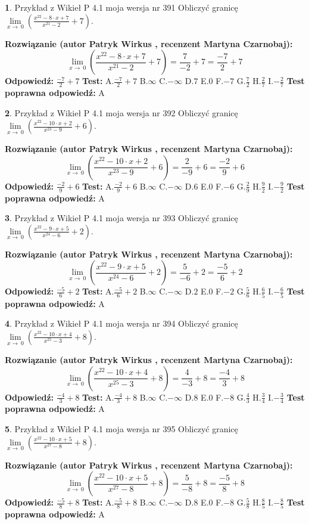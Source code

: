 \documentclass[12pt, a4paper]{article}
\theoremstyle{definition} %
\newtheorem{zad}{}
\newcommand{\zadStart}[1]{\begin{zad}#1\newline}
\newcommand{\zadStop}{\end{zad}}
\newcommand{\rozwStart}[2]{\noindent \textbf{Rozwiązanie (autor #1 , recenzent #2): }\newline}
\newcommand{\rozwStop}{\newline}
\newcommand{\odpStart}{\noindent \textbf{Odpowiedź:}\newline}
\newcommand{\odpStop}{\newline}
\newcommand{\testStart}{\noindent \textbf{Test:}\newline}
\newcommand{\testStop}{\newline}
\newcommand{\kluczStart}{\noindent \textbf{Test poprawna odpowiedź:}\newline}
\newcommand{\kluczStop}{\newline}
\begin{document}
\zadStart{Przykład z Wikieł P 4.1 moja wersja nr 391}
Obliczyć granicę $\lim\limits_{x\to\ 0}(\frac{x^{22}-8 \cdot x +7}{x^{21}-2}+7)$.
\zadStop
\rozwStart{Patryk Wirkus}{Martyna Czarnobaj}
$$\lim\limits_{x\to\ 0}(\frac{x^{22}-8 \cdot x +7}{x^{21}-2}+7)=\frac{7}{-2}+7=\frac{-7}{2}+7$$
\rozwStop
\odpStart
$\frac{-7}{2}+7$
\odpStop
\testStart
A.$\frac{-7}{2}+7$
B.$\infty$
C.$-\infty$
D.$7$
E.$0$
F.$-7$
G.$\frac{7}{2}$
H.$\frac{2}{7}$
I.$-\frac{2}{7}$
\testStop
\kluczStart
A
\kluczStop



\zadStart{Przykład z Wikieł P 4.1 moja wersja nr 392}
Obliczyć granicę $\lim\limits_{x\to\ 0}(\frac{x^{22}-10 \cdot x +2}{x^{23}-9}+6)$.
\zadStop
\rozwStart{Patryk Wirkus}{Martyna Czarnobaj}
$$\lim\limits_{x\to\ 0}(\frac{x^{22}-10 \cdot x +2}{x^{23}-9}+6)=\frac{2}{-9}+6=\frac{-2}{9}+6$$
\rozwStop
\odpStart
$\frac{-2}{9}+6$
\odpStop
\testStart
A.$\frac{-2}{9}+6$
B.$\infty$
C.$-\infty$
D.$6$
E.$0$
F.$-6$
G.$\frac{2}{9}$
H.$\frac{9}{2}$
I.$-\frac{9}{2}$
\testStop
\kluczStart
A
\kluczStop



\zadStart{Przykład z Wikieł P 4.1 moja wersja nr 393}
Obliczyć granicę $\lim\limits_{x\to\ 0}(\frac{x^{22}-9 \cdot x +5}{x^{24}-6}+2)$.
\zadStop
\rozwStart{Patryk Wirkus}{Martyna Czarnobaj}
$$\lim\limits_{x\to\ 0}(\frac{x^{22}-9 \cdot x +5}{x^{24}-6}+2)=\frac{5}{-6}+2=\frac{-5}{6}+2$$
\rozwStop
\odpStart
$\frac{-5}{6}+2$
\odpStop
\testStart
A.$\frac{-5}{6}+2$
B.$\infty$
C.$-\infty$
D.$2$
E.$0$
F.$-2$
G.$\frac{5}{6}$
H.$\frac{6}{5}$
I.$-\frac{6}{5}$
\testStop
\kluczStart
A
\kluczStop



\zadStart{Przykład z Wikieł P 4.1 moja wersja nr 394}
Obliczyć granicę $\lim\limits_{x\to\ 0}(\frac{x^{22}-10 \cdot x +4}{x^{25}-3}+8)$.
\zadStop
\rozwStart{Patryk Wirkus}{Martyna Czarnobaj}
$$\lim\limits_{x\to\ 0}(\frac{x^{22}-10 \cdot x +4}{x^{25}-3}+8)=\frac{4}{-3}+8=\frac{-4}{3}+8$$
\rozwStop
\odpStart
$\frac{-4}{3}+8$
\odpStop
\testStart
A.$\frac{-4}{3}+8$
B.$\infty$
C.$-\infty$
D.$8$
E.$0$
F.$-8$
G.$\frac{4}{3}$
H.$\frac{3}{4}$
I.$-\frac{3}{4}$
\testStop
\kluczStart
A
\kluczStop



\zadStart{Przykład z Wikieł P 4.1 moja wersja nr 395}
Obliczyć granicę $\lim\limits_{x\to\ 0}(\frac{x^{22}-10 \cdot x +5}{x^{27}-8}+8)$.
\zadStop
\rozwStart{Patryk Wirkus}{Martyna Czarnobaj}
$$\lim\limits_{x\to\ 0}(\frac{x^{22}-10 \cdot x +5}{x^{27}-8}+8)=\frac{5}{-8}+8=\frac{-5}{8}+8$$
\rozwStop
\odpStart
$\frac{-5}{8}+8$
\odpStop
\testStart
A.$\frac{-5}{8}+8$
B.$\infty$
C.$-\infty$
D.$8$
E.$0$
F.$-8$
G.$\frac{5}{8}$
H.$\frac{8}{5}$
I.$-\frac{8}{5}$
\testStop
\kluczStart
A
\kluczStop
\end{document}
